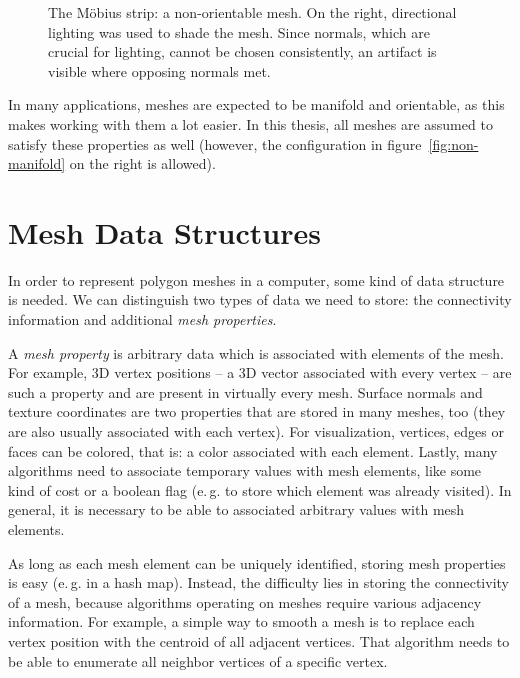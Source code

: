 \begin{figure}[t]
  \centering
  
  \caption{The Möbius strip: a non-orientable mesh.
    On the right, directional lighting was used to shade the mesh.
    Since normals, which are crucial for lighting, cannot be chosen consistently, an artifact is visible where opposing normals met.}
  \label{fig:moebius}
\end{figure}


In many applications, meshes are expected to be manifold and orientable, as this makes working with them a lot easier.
In this thesis, all meshes are assumed to satisfy these properties as well (however, the configuration in figure~\ref{fig:non-manifold} on the right is allowed).


\section{Mesh Data Structures}

In order to represent polygon meshes in a computer, some kind of data structure is needed.
We can distinguish two types of data we need to store: the connectivity information and additional \emph{mesh properties}.

A \emph{mesh property} is arbitrary data which is associated with elements of the mesh.
For example, 3D vertex positions -- a 3D vector associated with every vertex -- are such a property and are present in virtually every mesh.
Surface normals and texture coordinates are two properties that are stored in many meshes, too (they are also usually associated with each vertex).
For visualization, vertices, edges or faces can be colored, that is: a color associated with each element.
Lastly, many algorithms need to associate temporary values with mesh elements, like some kind of cost or a boolean flag (e.\,g. to store which element was already visited).
In general, it is necessary to be able to associated arbitrary values with mesh elements.

As long as each mesh element can be uniquely identified, storing mesh properties is easy (e.\,g. in a hash map).
Instead, the difficulty lies in storing the connectivity of a mesh, because algorithms operating on meshes require various adjacency information.
For example, a simple way to smooth a mesh is to replace each vertex position with the centroid of all adjacent vertices.
That algorithm needs to be able to enumerate all neighbor vertices of a specific vertex.

